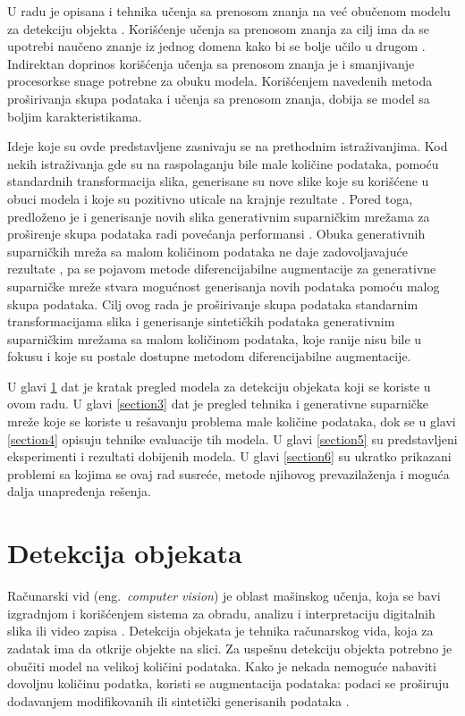 \documentclass[12pt,oneside]{memoir}
\begin{document}
U radu je opisana i tehnika učenja sa prenosom znanja \cite{zhuang2020comprehensive} na već obučenom modelu za detekciju objekta \cite{bochkovskiy2020yolov4}. Korišćenje učenja sa prenosom znanja za cilj ima da se upotrebi naučeno znanje iz jednog domena kako bi se bolje učilo u drugom \cite{bengio2012deep}. Indirektan doprinos korišćenja učenja sa prenosom znanja je i smanjivanje procesorkse snage potrebne za obuku modela.
Korišćenjem navedenih metoda proširivanja skupa podataka i učenja sa prenosom znanja, dobija se model sa boljim karakteristikama.

Ideje koje su ovde predstavljene zasnivaju se na prethodnim istraživanjima. Kod nekih istraživanja gde su na raspolaganju bile male količine podataka, pomoću standardnih transformacija slika, generisane su nove slike koje su korišćene u obuci modela i koje su pozitivno uticale na krajnje rezultate  \cite{brigato2021close}. Pored toga, predloženo je i generisanje novih slika generativnim suparničkim mrežama za proširenje skupa podataka radi povećanja performansi \cite{brigato2021close,liu2019generative}. Obuka generativnih suparničkih mreža sa malom količinom podataka ne daje zadovoljavajuće rezultate \cite{brigato2021close}, pa se pojavom metode diferencijabilne augmentacije za generativne suparničke mreže \cite{zhao2020differentiable} stvara mogućnost generisanja novih podataka pomoću malog skupa podataka. 
Cilj ovog rada je proširivanje skupa podataka standarnim transformacijama slika i generisanje sintetičkih podataka generativnim suparničkim mrežama sa malom količinom podataka, koje ranije nisu bile u fokusu i koje su postale dostupne metodom diferencijabilne augmentacije.

U glavi \ref{section2} dat je kratak pregled modela za detekciju objekata koji se koriste u ovom radu. U glavi \ref{section3} dat je pregled tehnika i generativne suparničke mreže koje se koriste u rešavanju problema male količine podataka, dok se u glavi \ref{section4} opisuju tehnike evaluacije tih modela. U glavi \ref{section5} su predstavljeni eksperimenti i rezultati dobijenih modela. U glavi \ref{section6} su ukratko prikazani problemi sa kojima se ovaj rad susreće, metode njihovog prevazilaženja i moguća dalja unapređenja rešenja.


\chapter{Detekcija objekata}
\label{section2}
Računarski vid (eng.~\textit{computer vision}) je oblast mašinskog učenja, koja se bavi izgradnjom i korišćenjem  sistema za obradu, analizu i interpretaciju digitalnih slika ili video zapisa \cite{ballard1982computer, huang1996computer}.
Detekcija objekata je tehnika računarskog vida, koja za zadatak ima 
da otkrije objekte na slici. Za uspešnu detekciju objekta potrebno je obučiti model na velikoj količini podataka. 
Kako je nekada nemoguće nabaviti dovoljnu količinu podatka, koristi se augmentacija podataka: podaci se proširuju dodavanjem modifikovanih ili sintetički generisanih podataka \cite{shorten2019survey}. 
\end{document}
